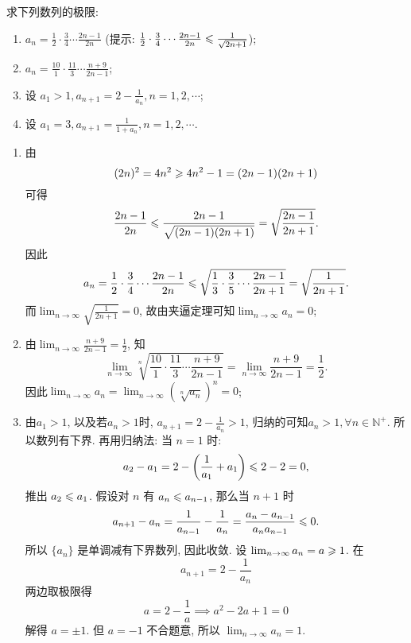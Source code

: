 \begin{exercise}[1.C.1]
    求下列数列的极限:
    \begin{enumerate}[(1)]
        \item $a_n = \frac{1}{2} \cdot \frac{3}{4} \cdots \frac{2n-1}{2n}$ (提示: $\frac{1}{2} \cdot \frac{3}{4} \cdots \frac{2n-1}{2n} \leqslant \frac{1}{\sqrt{2n+1}}$);
        \item $a_n = \frac{10}{1} \cdot \frac{11}{3} \cdots \frac{n+9}{2n-1}$;
        \item 设 $a_1 > 1,  a_{n+1} = 2 - \frac{1}{a_n},  n=1, 2, \cdots$;
        \item 设 $a_1 = 3,  a_{n+1} = \frac{1}{1+a_n},  n=1, 2, \cdots$.
    \end{enumerate}
\end{exercise}

\begin{solution}
    \begin{enumerate}[(1)]
        \item 由$$(2n)^2 = 4n^2 \geqslant 4n^2 - 1 = (2n-1)(2n+1)$$可得$$\frac{2n-1}{2n} \leqslant \frac{2n-1}{\sqrt{(2n-1)(2n+1)}} = \sqrt{\frac{2n-1}{2n+1}}.$$因此$$a_n = \frac{1}{2} \cdot \frac{3}{4} \cdots \frac{2n-1}{2n} \leqslant \sqrt{\frac{1}{3} \cdot \frac{3}{5} \cdots \frac{2n-1}{2n+1}} = \sqrt{\frac{1}{2n+1}}.$$
              而$\lim_{n\to\infty} \sqrt{\frac{1}{2n+1}} = 0$,  故由夹逼定理可知$\lim_{n\to\infty} a_n = 0$;
        \item 由$\lim_{n \to \infty} \frac{n+9}{2n-1} = \frac{1}{2}$, 知$$\lim_{n\to\infty} \sqrt[n]{\frac{10}{1} \cdot \frac{11}{3} \cdots \frac{n+9}{2n-1}} = \lim_{n\to\infty} \frac{n+9}{2n-1} = \frac{1}{2}.$$
              因此$\lim_{n\to\infty} a_n = \lim_{n\to\infty} \left(\sqrt[n]{a_n}\right)^n = 0$;
        \item 由$a_1 > 1$, 以及若$a_n > 1$时,  $a_{n+1} = 2 - \frac{1}{a_n} > 1$, 归纳的可知$a_n > 1,  \forall n \in \mathbb{N}^+$. 所以数列有下界. 再用归纳法: 当 $n=1$ 时:
              $$ a_2 - a_1 = 2 - \left(\frac{1}{a_1} + a_1\right) \leqslant 2-2=0,  $$
              推出 $a_2 \leqslant a_1$. 假设对 $n$ 有 $a_n \leqslant a_{n-1}$,  那么当 $n+1$ 时
              $$ a_{n+1} - a_n = \frac{1}{a_{n-1}} - \frac{1}{a_n} = \frac{a_n - a_{n-1}}{a_n a_{n-1}} \leqslant 0. $$
              所以 $\{a_n\}$ 是单调减有下界数列,  因此收敛. 设 $\lim_{n \to \infty} a_n = a \geqslant 1$. 在
              $$ a_{n+1} = 2 - \frac{1}{a_n} $$
              两边取极限得
              $$ a = 2 - \frac{1}{a} \implies a^2 - 2a + 1 = 0 $$
              解得 $a=\pm 1$. 但 $a=-1$ 不合题意,  所以 $\lim_{n \to \infty} a_n = 1$.

\end{enumerate}
\end{solution}
